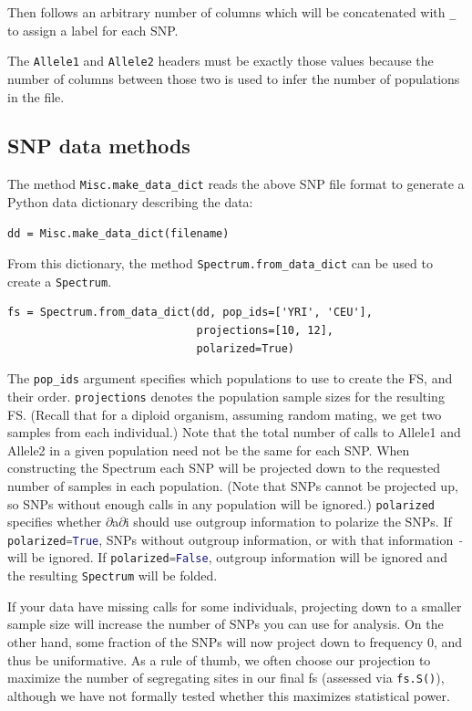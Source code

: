 \documentclass[12pt]{article}
\makeatletter
\newcommand{\dadi}{$\partial$a$\partial$i\xspace}
\newcommand{\py}[1]{\lstinline[language=Python, showstringspaces=False]@#1@}
\makeatother
\begin{document}
Then follows an arbitrary number of columns which will be concatenated with \py{_} to assign a label for each SNP.

The \py{Allele1} and \py{Allele2} headers must be exactly those values because the number of columns between those two is used to infer the number of populations in the file.

\subsection{SNP data methods}

The method \py{Misc.make_data_dict} reads the above SNP file format to generate a Python data dictionary describing the data:
\begin{lstlisting}
dd = Misc.make_data_dict(filename)
\end{lstlisting}
From this dictionary, the method \py{Spectrum.from_data_dict} can be used to create a \py{Spectrum}.
\begin{lstlisting}
fs = Spectrum.from_data_dict(dd, pop_ids=['YRI', 'CEU'],
                             projections=[10, 12],
                             polarized=True)
\end{lstlisting}
The \py{pop_ids} argument specifies which populations to use to create the FS, and their order.
\py{projections} denotes the population sample sizes for the resulting FS.
(Recall that for a diploid organism, assuming random mating, we get two samples from each individual.)
Note that the total number of calls to Allele1 and Allele2 in a given population need not be the same for each SNP.
When constructing the Spectrum each SNP will be projected down to the requested number of samples in each population.
(Note that SNPs cannot be projected up, so SNPs without enough calls in any population will be ignored.)
\py{polarized} specifies whether \dadi should use outgroup information to polarize the SNPs.
If \py{polarized=True}, SNPs without outgroup information, or with that information \py{-} will be ignored.
If \py{polarized=False}, outgroup information will be ignored and the resulting \py{Spectrum} will be folded.

If your data have missing calls for some individuals, projecting down to a smaller sample size will increase the number of SNPs you can use for analysis.
On the other hand, some fraction of the SNPs will now project down to frequency 0, and thus be uniformative.
As a rule of thumb, we often choose our projection to maximize the number of segregating sites in our final fs (assessed via \py{fs.S()}), although we have not formally tested whether this maximizes statistical power.
\end{document}
